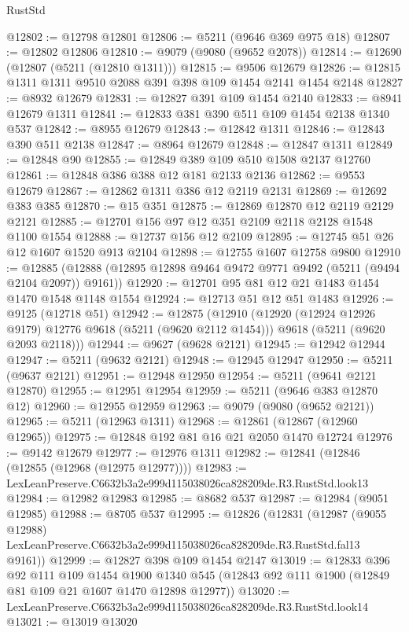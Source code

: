 \begin{lexlean}{RustStd}
\begin{coremodule}
@12802 := @12798 @12801
@12806 := @5211 (@9646 @369 @975 @18)
@12807 := @12802 @12806
@12810 := @9079 (@9080 (@9652 @2078))
@12814 := @12690 (@12807 (@5211 (@12810 @1311)))
@12815 := @9506 @12679
@12826 := @12815 @1311 @1311 @9510 @2088 @391 @398 @109 @1454 @2141 @1454 @2148
@12827 := @8932 @12679
@12831 := @12827 @391 @109 @1454 @2140
@12833 := @8941 @12679 @1311
@12841 := @12833 @381 @390 @511 @109 @1454 @2138 @1340 @537
@12842 := @8955 @12679
@12843 := @12842 @1311
@12846 := @12843 @390 @511 @2138
@12847 := @8964 @12679
@12848 := @12847 @1311
@12849 := @12848 @90
@12855 := @12849 @389 @109 @510 @1508 @2137 @12760
@12861 := @12848 @386 @388 @12 @181 @2133 @2136
@12862 := @9553 @12679
@12867 := @12862 @1311 @386 @12 @2119 @2131
@12869 := @12692 @383 @385
@12870 := @15 @351
@12875 := @12869 @12870 @12 @2119 @2129 @2121
@12885 := @12701 @156 @97 @12 @351 @2109 @2118 @2128 @1548 @1100 @1554
@12888 := @12737 @156 @12 @2109
@12895 := @12745 @51 @26 @12 @1607 @1520 @913 @2104
@12898 := @12755 @1607 @12758 @9800
@12910 := @12885 (@12888 (@12895 @12898 @9464 @9472 @9771 @9492 (@5211 (@9494 @2104 @2097)) @9161))
@12920 := @12701 @95 @81 @12 @21 @1483 @1454 @1470 @1548 @1148 @1554
@12924 := @12713 @51 @12 @51 @1483
@12926 := @9125 (@12718 @51)
@12942 := @12875
    (@12910
      (@12920 (@12924 @12926 @9179) @12776 @9618 (@5211 (@9620 @2112 @1454)))
      @9618
      (@5211 (@9620 @2093 @2118)))
@12944 := @9627 (@9628 @2121)
@12945 := @12942 @12944
@12947 := @5211 (@9632 @2121)
@12948 := @12945 @12947
@12950 := @5211 (@9637 @2121)
@12951 := @12948 @12950
@12954 := @5211 (@9641 @2121 @12870)
@12955 := @12951 @12954
@12959 := @5211 (@9646 @383 @12870 @12)
@12960 := @12955 @12959
@12963 := @9079 (@9080 (@9652 @2121))
@12965 := @5211 (@12963 @1311)
@12968 := @12861 (@12867 (@12960 @12965))
@12975 := @12848 @192 @81 @16 @21 @2050 @1470 @12724
@12976 := @9142 @12679
@12977 := @12976 @1311
@12982 := @12841 (@12846 (@12855 (@12968 (@12975 @12977))))
@12983 := LexLeanPreserve.C6632b3a2e999d115038026ca828209de.R3.RustStd.look13
@12984 := @12982 @12983
@12985 := @8682 @537
@12987 := @12984 (@9051 @12985)
@12988 := @8705 @537
@12995 := @12826
    (@12831
      (@12987
        (@9055 @12988)
        LexLeanPreserve.C6632b3a2e999d115038026ca828209de.R3.RustStd.fal13
        @9161))
@12999 := @12827 @398 @109 @1454 @2147
@13019 := @12833
    @396
    @92
    @111
    @109
    @1454
    @1900
    @1340
    @545
    (@12843 @92 @111 @1900 (@12849 @81 @109 @21 @1607 @1470 @12898 @12977))
@13020 := LexLeanPreserve.C6632b3a2e999d115038026ca828209de.R3.RustStd.look14
@13021 := @13019 @13020

\end{coremodule}
\end{lexlean}
